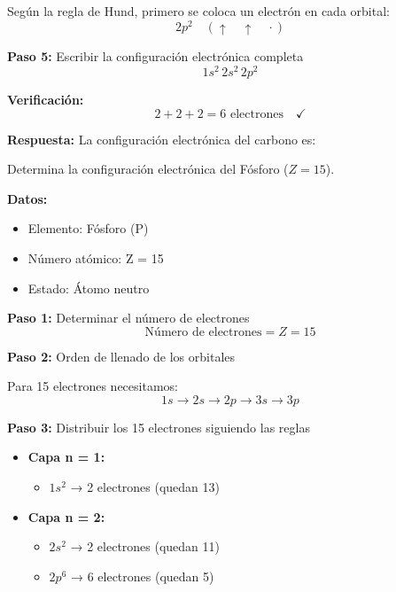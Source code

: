 \begin{exercise}
\begin{solu}
\begin{itemize}
            Según la regla de Hund, primero se coloca un electrón en cada orbital:
            \[
                2p^2 \quad (\uparrow \quad \uparrow \quad \cdot)
            \]
        \end{itemize}

        \textbf{Paso 5:} Escribir la configuración electrónica completa
        \[
            \boxed{1s^2 \, 2s^2 \, 2p^2}
        \]

        \textbf{Verificación:}
        \[
            2 + 2 + 2 = 6 \text{ electrones} \quad \checkmark
        \]

        \textbf{Respuesta:} La configuración electrónica del carbono es: 
    \end{solu}
\end{exercise}
\begin{exercise}
    Determina la configuración electrónica del Fósforo (\( Z = 15 \)).
    \begin{solu}
        \textbf{Datos:}
        \begin{itemize}
            \item Elemento: Fósforo (P)
            \item Número atómico: Z = 15
            \item Estado: Átomo neutro
        \end{itemize}

        \textbf{Paso 1:} Determinar el número de electrones
        \[
            \text{Número de electrones} = Z = 15
        \]

        \textbf{Paso 2:} Orden de llenado de los orbitales

        Para 15 electrones necesitamos:
        \[
            1s \rightarrow 2s \rightarrow 2p \rightarrow 3s \rightarrow 3p
        \]

        \textbf{Paso 3:} Distribuir los 15 electrones siguiendo las reglas

        \begin{itemize}
            \item \textbf{Capa n = 1:}
            \begin{itemize}
                \item \(1s^2\) → 2 electrones (quedan 13)
            \end{itemize}

            \item \textbf{Capa n = 2:}
            \begin{itemize}
                \item \(2s^2\) → 2 electrones (quedan 11)
                \item \(2p^6\) → 6 electrones (quedan 5)
            \end{itemize}


\end{itemize}
\end{solu}
\end{exercise}
